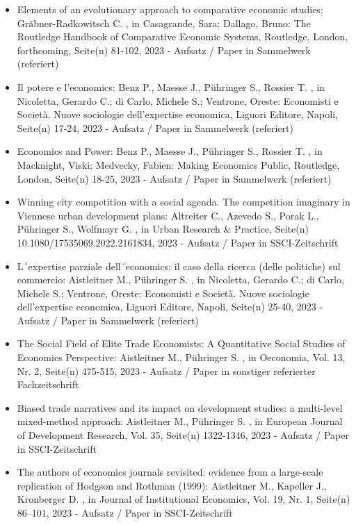 \begin{itemize}
	 \item Elements of an evolutionary approach to comparative economic studies: Gräbner-Radkowitsch C. , in Casagrande, Sara; Dallago, Bruno: The Routledge Handbook of Comparative Economic Systems, Routledge, London, forthcoming, Seite(n) 81-102, 2023 - Aufsatz / Paper in Sammelwerk (referiert)
	 \item Il potere e l'economics: Benz P., Maesse J., Pühringer S., Rossier T. , in Nicoletta, Gerardo C.; di Carlo, Michele S.; Ventrone, Oreste: Economisti e Società. Nuove sociologie dell'expertise economica, Liguori Editore, Napoli, Seite(n) 17-24, 2023 - Aufsatz / Paper in Sammelwerk (referiert)
	 \item Economics and Power: Benz P., Maesse J., Pühringer S., Rossier T. , in Macknight, Viski; Medvecky, Fabien: Making Economics Public, Routledge, London, Seite(n) 18-25, 2023 - Aufsatz / Paper in Sammelwerk (referiert)
	 \item Winning city competition with a social agenda. The competition imaginary in Viennese urban development plans: Altreiter C., Azevedo S., Porak L., Pühringer S., Wolfmayr G. , in Urban Research & Practice, Seite(n) 10.1080/17535069.2022.2161834, 2023 - Aufsatz / Paper in SSCI-Zeitschrift
	 \item L´expertise parziale dell´economics: il caso della ricerca (delle politiche) sul commercio: Aistleitner M., Pühringer S. , in Nicoletta, Gerardo C.; di Carlo, Michele S.; Ventrone, Oreste: Economisti e Società. Nuove sociologie dell'expertise economica, Liguori Editore, Napoli, Seite(n) 25-40, 2023 - Aufsatz / Paper in Sammelwerk (referiert)
	 \item The Social Field of Elite Trade Economists: A Quantitative Social Studies of Economics Perspective: Aistleitner M., Pühringer S. , in Oeconomia, Vol. 13, Nr. 2, Seite(n) 475-515, 2023 - Aufsatz / Paper in sonstiger referierter Fachzeitschrift
	 \item Biased trade narratives and its impact on development studies: a multi-level mixed-method approach: Aistleitner M., Pühringer S. , in European Journal of Development Research, Vol. 35, Seite(n) 1322-1346, 2023 - Aufsatz / Paper in SSCI-Zeitschrift
	 \item The authors of economics journals revisited: evidence from a large-scale replication of Hodgson and Rothman (1999): Aistleitner M., Kapeller J., Kronberger D. , in Journal of Institutional Economics, Vol. 19, Nr. 1, Seite(n) 86–101, 2023 - Aufsatz / Paper in SSCI-Zeitschrift
\end{itemize} 
